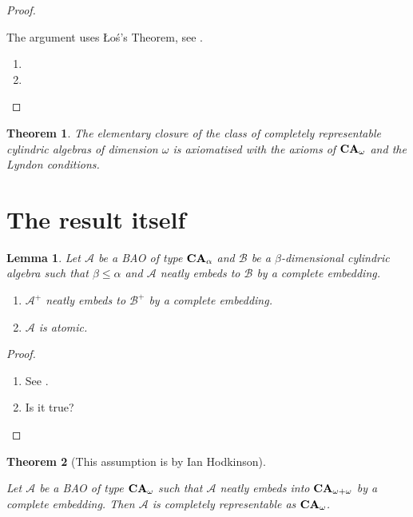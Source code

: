 \documentclass[a4paper]{article}
\theoremstyle{defin}
\theoremstyle{theorem}
\newtheorem{theorem}{Theorem}
\theoremstyle{prop}
\theoremstyle{lemma}
\newtheorem{lemma}{Lemma}
\theoremstyle{fact}
\theoremstyle{ex}
\theoremstyle{col}
\let\strokeL\L
\DeclareRobustCommand{\L}{\ifmmode\mathbf{L}\else\strokeL\fi}
\begin{document}
\begin{proof}
  $ $

  The argument uses \L o\'s's Theorem, see \cite[Theorem 9.5.1]{hodges1993model}.

  \begin{enumerate}
    \item
    \item
  \end{enumerate}
\end{proof}

\begin{theorem}
  The elementary closure of the class of completely representable cylindric algebras of dimension $\omega$ is axiomatised with the axioms of ${\bf CA}_{\omega}$ and the Lyndon conditions.
\end{theorem}

\section{The result itself}

\begin{lemma}\label{Neat}
  Let $\mathcal{A}$ be a BAO of type ${\bf CA}_{\alpha}$ and $\mathcal{B}$ be a $\beta$-dimensional cylindric algebra such that $\beta \leq \alpha$ and $\mathcal{A}$ neatly embeds to $\mathcal{B}$ by a complete embedding.

  \begin{enumerate}
  \item $\mathcal{A}^{+}$ neatly embeds to $\mathcal{B}^{+}$ by a complete embedding.
  \item $\mathcal{A}$ is atomic.
  \end{enumerate}
\end{lemma}

\begin{proof}
$ $

\begin{enumerate}
  \item See \cite[Remark 2.7.25]{henkin1971cylindric}.
  \item Is it true?
\end{enumerate}
\end{proof}

\begin{theorem}[This assumption is by Ian Hodkinson]\label{Neat2}
  $ $

  Let $\mathcal{A}$ be a BAO of type ${\bf CA}_{\omega}$ such that $\mathcal{A}$ neatly embeds into ${\bf CA}_{\omega + \omega}$ by a complete embedding. Then $\mathcal{A}$ is completely representable as ${\bf CA}_{\omega}$.
\end{theorem}
\end{document}
